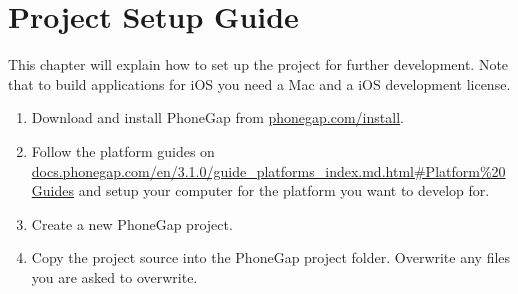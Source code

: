 \chapter{Project Setup Guide}

This chapter will explain how to set up the project for further development. Note that to build applications for iOS you need a Mac and a iOS development license\cite{iosCost}.

\begin{enumerate}
	\item{Download and install PhoneGap from \href{http://phonegap.com/install/}{phonegap.com/install}.}
	\item{Follow the platform guides on \newline \href{http://docs.phonegap.com/en/3.1.0/guide_platforms_index.md.html#Platform%20Guides}{docs.phonegap.com/en/3.1.0/guide\_platforms\_index.md.html\#Platform\%20Guides} and setup your computer for the platform you want to develop for.}
	\item{Create a new PhoneGap project.}
	\item{Copy the project source into the PhoneGap project folder. Overwrite any files you are asked to overwrite.}
\end{enumerate}